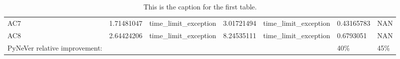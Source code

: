 \begin{table}[]
{\begin{tabular}{@{}lllllll@{}}
    AC7     & {\color[HTML]{ACB9CA} 1.71481047} & {\color[HTML]{ACB9CA} time\_limit\_exception} & {\color[HTML]{ACB9CA} 3.01721494} & {\color[HTML]{ACB9CA} time\_limit\_exception} & {\color[HTML]{ACB9CA} 0.43165783} & {\color[HTML]{ACB9CA} NAN}        \\
    AC8     & {\color[HTML]{ACB9CA} 2.64424206} & {\color[HTML]{ACB9CA} time\_limit\_exception} & {\color[HTML]{ACB9CA} 8.24535111} & {\color[HTML]{ACB9CA} time\_limit\_exception} & {\color[HTML]{ACB9CA} 0.6793051}  & {\color[HTML]{ACB9CA} NAN}        \\ \cmidrule(r){1-7}
    PyNeVer relative improvement:        &                                   &                                               &                                   &                                               & {\color[HTML]{FF0000} 40\%}       & {\color[HTML]{FF0000} 45\%}       \\ \cmidrule(r){1-7}
    \end{tabular}%
    }
    \caption{This is the caption for the first table.}
    \label{table:AC}
\end{table}


